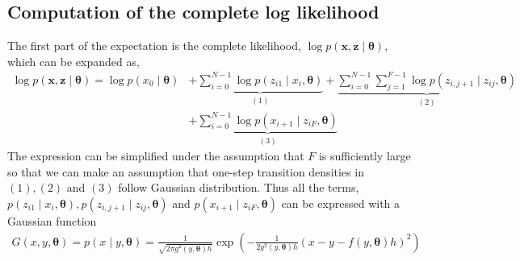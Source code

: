 \documentclass[12pt]{article}
\newcommand{\bx}{\ensuremath{\mathbf{x}}}
\newcommand{\bz}{\ensuremath{\mathbf{z}}}
\newcommand{\btheta}{\ensuremath{\boldsymbol{\theta}}}
\begin{document}
\subsection{Computation of the complete log likelihood}
\label{sect:loglik}
The first part of the expectation is the complete likelihood, $\log p(\bx, \bz \mid \btheta)$, which can be expanded as,
\begin{align}
\label{eqn:loglik}
\log p(\bx, \bz \mid \btheta) = \log p(x_0 \mid \btheta) & + \underbrace{\sum_{i=0}^{N-1} \log p(z_{i1} \mid x_i, \btheta)}_{(1)} + \underbrace{\sum_{i=0}^{N-1} \sum_{j=1}^{F-1} \log p(z_{i,j+1} \mid z_{ij}, \btheta)}_{(2)} \nonumber \\ 
& + \underbrace{\sum_{i=0}^{N-1} \log p(x_{i+1} \mid z_{iF}, \btheta)}_{(3)} 
\end{align}
The expression can be simplified under the assumption that $F$ is sufficiently large so that we can make an assumption that one-step transition densities in $(1), (2)$ and $(3)$ follow Gaussian distribution. Thus all the terms, $p(z_{i1} \mid x_i, \btheta), p(z_{i,j+1} \mid z_{ij}, \btheta)$ and $p(x_{i+1} \mid z_{iF}, \btheta)$ can be expressed with a Gaussian function
\begin{align*}
G(x,y, \btheta) = p(x \mid y, \btheta) = \frac{1}{\sqrt{2 \pi g^2(y, \btheta)h}} \exp \left( - \frac{1}{2 g^2(y, \btheta)h} (x - y - f(y, \btheta)h)^2 \right)
\end{align*}
\end{document}

